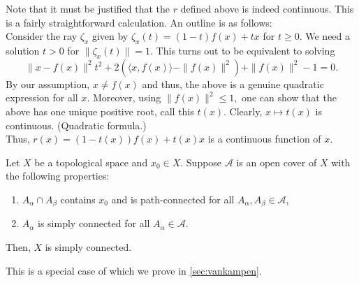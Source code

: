 \documentclass[12pt]{article}
\begin{document}
Note that it must be justified that the $r$ defined above is indeed continuous. This is a fairly straightforward calculation. An outline is as follows:\\
Consider the ray $\zeta_x$ given by $\zeta_x(t) = (1 - t)f(x) + tx$ for $t \ge 0.$ We need a solution $t > 0$ for $\|\zeta_x(t)\| = 1.$ This turns out to be equivalent to solving
\begin{equation*} 
	\|x - f(x)\|^2 t^2 + 2(\langle x, f(x)\rangle - \|f(x)\|^2) + \|f(x)\|^2 - 1 = 0.
\end{equation*} 
By our assumption, $x \neq f(x)$ and thus, the above is a genuine quadratic expression for all $x.$ Moreover, using $\|f(x)\|^2 \le 1,$ one can show that the above has one unique positive root, call this $t(x).$ Clearly, $x \mapsto t(x)$ is continuous. (Quadratic formula.)\\
Thus, $r(x) = (1 - t(x))f(x) + t(x)x$ is a continuous function of $x.$

\begin{thm} \label{thm:vankampenspecial}
	Let $X$ be a topological space and $x_0 \in X.$ Suppose $\mathcal{A}$ is an open cover of $X$ with the following properties:
	\begin{enumerate}
		\item $A_\alpha \cap A_\beta$ contains $x_0$ and is path-connected for all $A_\alpha, A_\beta \in \mathcal{A}$,
		\item $A_\alpha$ is simply connected for all $A_\alpha \in \mathcal{A}.$
	\end{enumerate}
	Then, $X$ is simply connected.
\end{thm}

This is a special case of  which we prove in \cref{sec:vankampen}.
\end{document}
